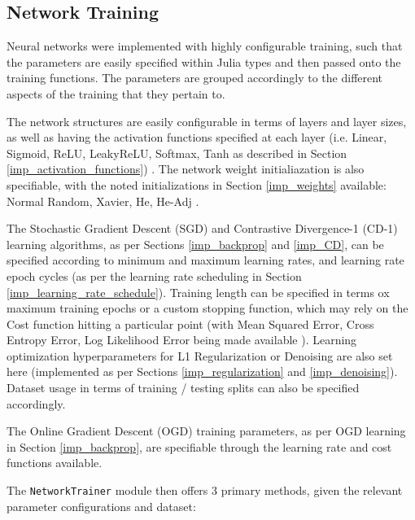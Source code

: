\documentclass[a4paper,11pt,oneside]{article}
\theoremstyle{plain}
\theoremstyle{definition}
\begin{document}
	
	\subsection{Network Training}
	
	Neural networks were implemented with highly configurable training, such that the parameters are easily specified within Julia types \citep{DCTrainingStructures} and then passed onto the training functions. The parameters are grouped accordingly to the different aspects of the training that they pertain to. \newline
	
	The network structures are easily configurable in terms of layers and layer sizes, as well as having the activation functions specified at each layer (i.e. Linear, Sigmoid, ReLU, LeakyReLU, Softmax, Tanh as described in Section \ref{imp_activation_functions}) \citep{DCActivationFunctions}. The network weight initialiazation is also specifiable, with the noted initializations in Section \ref{imp_weights} available: Normal Random, Xavier, He, He-Adj \citep{DCInitializationFunctions}.\newline
	
	The Stochastic Gradient Descent (SGD) and Contrastive Divergence-1 (CD-1) learning algorithms, as per Sections \ref{imp_backprop} and \ref{imp_CD}, can be specified according to minimum and maximum learning rates, and learning rate epoch cycles (as per the learning rate scheduling in Section \ref{imp_learning_rate_schedule}). Training length can be specified in terms ox maximum training epochs or a custom stopping function, which may rely on the Cost function hitting a particular point (with Mean Squared Error, Cross Entropy Error, Log Likelihood Error being made available \citep{DCCostFunctions}). Learning optimization hyperparameters for L1 Regularization or Denoising are also set here (implemented as per Sections \ref{imp_regularization} and \ref{imp_denoising}). Dataset usage in terms of training / testing splits can also be specified accordingly.\newline
	
	The Online Gradient Descent (OGD) training parameters, as per OGD learning in Section \ref{imp_backprop}, are specifiable through the learning rate and cost functions available.\newline
	
	The \texttt{NetworkTrainer} module \citep{DCNetworkTrainer} then offers 3 primary methods, given the relevant parameter configurations and dataset:
	
\end{document}
